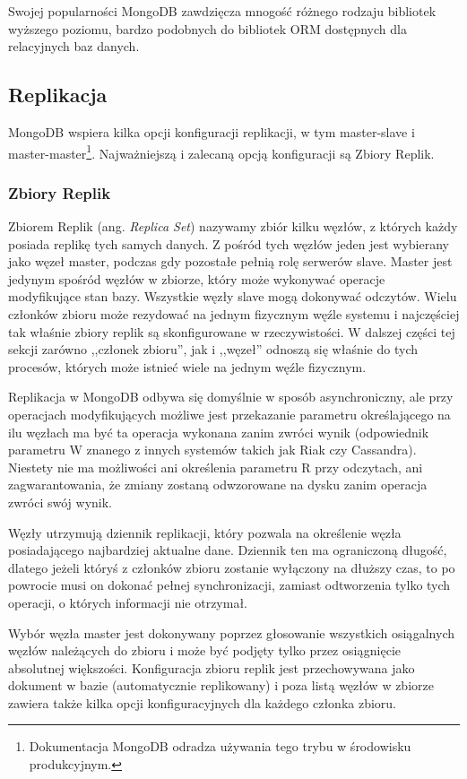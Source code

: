 Swojej popularności MongoDB zawdzięcza mnogość różnego rodzaju bibliotek wyższego poziomu, bardzo podobnych do bibliotek ORM dostępnych dla relacyjnych baz danych.

\subsection*{Replikacja}

MongoDB wspiera kilka opcji konfiguracji replikacji, w tym master-slave i master-master\footnote{Dokumentacja MongoDB odradza używania tego trybu w środowisku produkcyjnym.}.
Najważniejszą i zalecaną opcją konfiguracji są Zbiory Replik.

\subsubsection*{Zbiory Replik}

Zbiorem Replik (ang. \emph{Replica Set}) nazywamy zbiór kilku węzłów, z których każdy posiada replikę tych samych danych.
Z pośród tych węzłów jeden jest wybierany jako węzeł master, podczas gdy pozostałe pełnią rolę serwerów slave.
Master jest jedynym spośród węzłów w zbiorze, który może wykonywać operacje modyfikujące stan bazy.
Wszystkie węzły slave mogą dokonywać odczytów.
Wielu członków zbioru może rezydować na jednym fizycznym węźle systemu i najczęściej tak właśnie zbiory replik są skonfigurowane w rzeczywistości.
W dalszej części tej sekcji zarówno ,,członek zbioru'', jak i ,,węzeł'' odnoszą się właśnie do tych procesów, których może istnieć wiele na jednym węźle fizycznym.

Replikacja w MongoDB odbywa się domyślnie w sposób asynchroniczny, ale przy operacjach modyfikujących możliwe jest przekazanie parametru określającego na ilu węzłach ma być ta operacja wykonana zanim zwróci wynik (odpowiednik parametru W znanego z innych systemów takich jak Riak czy Cassandra).
Niestety nie ma możliwości ani określenia parametru R przy odczytach, ani zagwarantowania, że zmiany zostaną odwzorowane na dysku zanim operacja zwróci swój wynik.

Węzły utrzymują dziennik replikacji, który pozwala na określenie węzła posiadającego najbardziej aktualne dane.
Dziennik ten ma ograniczoną długość, dlatego jeżeli któryś z członków zbioru zostanie wyłączony na dłuższy czas, to po powrocie musi on dokonać pełnej synchronizacji, zamiast odtworzenia tylko tych operacji, o których informacji nie otrzymał.

Wybór węzła master jest dokonywany poprzez głosowanie wszystkich osiągalnych węzłów należących do zbioru i może być podjęty tylko przez osiągnięcie absolutnej większości.
Konfiguracja zbioru replik jest przechowywana jako dokument w bazie (automatycznie replikowany) i poza listą węzłów w zbiorze zawiera także kilka opcji konfiguracyjnych dla każdego członka zbioru.

